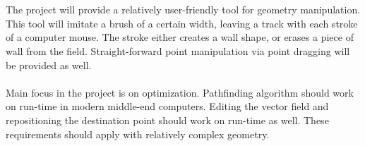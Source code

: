 \documentclass[a4paper,12pt]{article}
\begin{document}
\\
\\
The project will provide a relatively user-friendly tool for geometry manipulation. This tool will imitate a brush of a certain width, leaving a track with each stroke of a computer mouse. The stroke either creates a wall shape, or erases a piece of wall from the field. Straight-forward point manipulation via point dragging will be provided as well.
\\
\\
Main focus in the project is on optimization. Pathfinding algorithm should work on run-time in
modern middle-end computers. Editing the vector field and repositioning the destination point
should work on run-time as well. These requirements should apply with relatively complex geometry.
\end{document}
